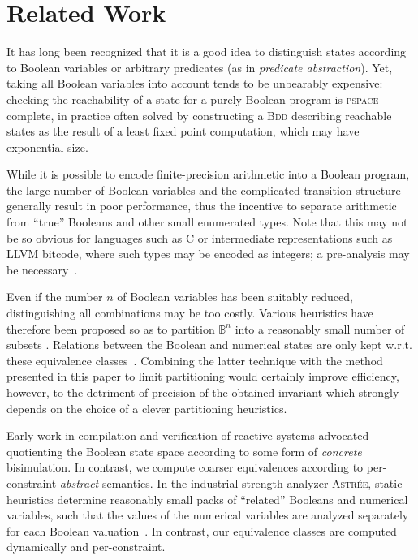 \documentclass{llncs}
\newcommand{\pponly}[1]{}
\newcommand{\rronly}[1]{#1}
\newcommand{\BB}{\mathbb{B}}
\begin{document}
\section{Related Work}
\pponly{\vspace*{-1ex}}
It has long been recognized that it is a good idea to distinguish
states according to Boolean variables or arbitrary predicates
(as in \emph{predicate abstraction}). Yet, taking all Boolean
variables into account tends to be unbearably expensive\rronly{: checking the
reachability of a state for a purely Boolean program is
\textsc{pspace}-complete, in practice often solved by constructing a
\textsc{Bdd} describing reachable states as the result of a least
fixed point computation, which may have exponential size}.
\rronly{

While it is possible to encode finite-precision arithmetic into a
Boolean program, the large number of Boolean variables and the
complicated transition structure generally result in poor performance,
thus the incentive to separate arithmetic from ``true'' Booleans and
other small enumerated types.  Note that this may not be so obvious
for languages such as C or intermediate representations such as LLVM
bitcode, where such types may be encoded as integers; a pre-analysis
may be necessary~\cite{DBLP:journals/entcs/JeannetS12}.

Even if the number $n$ of Boolean variables has been suitably
reduced, distinguishing all combinations may be too costly.} Various
heuristics have therefore been proposed so as to partition $\BB^n$
into a reasonably small number of subsets
\cite{DBLP:conf/sas/SchrammelJ11}. Relations between the Boolean and
numerical states are only kept w.r.t. these equivalence
classes~\cite{DBLP:conf/vmcai/SchrammelS13}.
Combining the latter technique with the method presented in this paper
to limit partitioning would certainly improve efficiency, however, to
the detriment of precision of the obtained invariant which strongly
depends on the choice of a clever partitioning heuristics.

Early work in compilation and verification of reactive systems
\cite{DBLP:journals/scp/BouajjaniFHR92} advocated quotienting the
Boolean state space according to some form of \emph{concrete}
bisimulation. In contrast, we compute coarser equivalences according
to per-constraint \emph{abstract} semantics.
In the \rronly{industrial-strength analyzer }\textsc{Astr\'ee}\pponly{
  analyzer}, static heuristics determine reasonably small packs of
``related'' Booleans and numerical variables, such that the values of
the numerical variables are analyzed separately for each Boolean
valuation~\cite[\S6.2.4]{BlanchetCousotEtAl_PLDI03}. In contrast, our
equivalence classes are computed dynamically and per-constraint.
\end{document}
